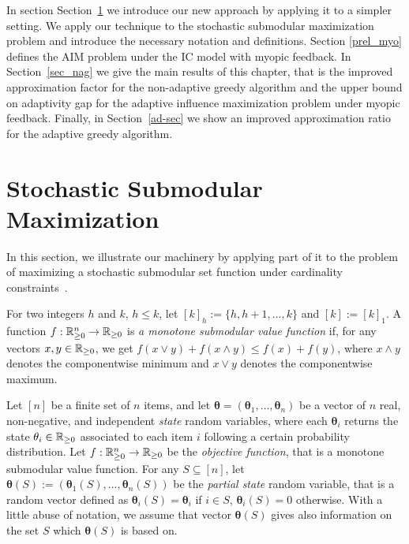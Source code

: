 In section Section~\ref{sec_example} we introduce our new approach by applying it to a simpler setting. We apply our technique to the stochastic submodular maximization problem and introduce the necessary notation and definitions. Section \ref{prel_myo} defines the AIM problem under the IC model with myopic feedback. In Section~\ref{sec_nag} we give the main results of this chapter, that is the improved approximation factor for the non-adaptive greedy algorithm and the upper bound on adaptivity gap for the adaptive influence maximization problem under myopic feedback. Finally, in Section~\ref{ad-sec} we show an improved approximation ratio for the adaptive greedy algorithm.  



\section{Stochastic Submodular Maximization} \label{sec_example}

In this section, we illustrate our machinery by applying part of it to the problem of maximizing a stochastic submodular set function under cardinality constraints~\cite{Asadpour16}. 

For two integers $h$ and $k$, $h\leq k$, let $[k]_h:=\{h,h+1,\ldots, k\}$ and $[k]:=[k]_1$. A function $f:\mathbb{R}_{\geq 0}^n\rightarrow \mathbb{R}_{\geq 0}$ is {\em a monotone submodular value function} if, for any vectors $x,y\in \mathbb{R}_{\geq 0}$, we get $f(x\vee y)+f(x\wedge y)\leq f(x)+f(y)$, where $x\wedge y$ denotes the componentwise minimum and $x\vee y$ denotes the componentwise maximum.

Let $[n]$ be a finite set of $n$  items, and let $\bm \theta=(\bm \theta_1,\ldots, \bm \theta_n)$ be a vector of $n$ real, non-negative, and independent {\em state} random variables, where each $\bm \theta_i$ returns the state $\theta_i\in \mathbb{R}_{\geq 0}$ associated to each item $i$ following a certain probability distribution. Let $f:\mathbb{R}_{\geq 0}^n\rightarrow \mathbb{R}_{\geq 0}$ be the {\em objective function}, that is a monotone submodular value function. For any $S\subseteq [n]$, let $\bm \theta(S):=(\bm \theta_1(S),\ldots, \bm \theta_n(S))$ be the {\em partial state} random variable, that is a random vector defined as $\bm \theta_i(S)=\bm \theta_i$ if $i\in S$, $\bm \theta_i(S)=0$ otherwise. With a little abuse of notation, we assume that vector $\bm \theta(S)$ gives also information on the set $S$ which $\bm \theta(S)$ is based on.

